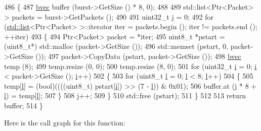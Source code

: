 \begin{DoxyCode}
486 \{
487   \hyperlink{namespacens3_a184f2682613716e1a24969b3e70b4242}{bvec} buffer (burst->GetSize () * 8, 0);
488 
489   std::list<Ptr<Packet> > packets = burst->GetPackets ();
490 
491   uint32\_t j = 0;
492   \textcolor{keywordflow}{for} (\hyperlink{openflow-interface_8h_afd9bcfa176617760671b67580f536fa7}{std::list}<Ptr<Packet> >::iterator iter = packets.begin (); iter != packets.end (); ++iter)
493     \{
494       Ptr<Packet> packet = *iter;
495       uint8\_t *pstart = (uint8\_t*) std::malloc (packet->GetSize ());
496       std::memset (pstart, 0, packet->GetSize ());
497       packet->CopyData (pstart, packet->GetSize ());
498       \hyperlink{namespacens3_a184f2682613716e1a24969b3e70b4242}{bvec} temp (8);
499       temp.resize (0, 0);
500       temp.resize (8, 0);
501       \textcolor{keywordflow}{for} (uint32\_t \hyperlink{bernuolliDistribution_8m_a6f6ccfcf58b31cb6412107d9d5281426}{i} = 0; \hyperlink{bernuolliDistribution_8m_a6f6ccfcf58b31cb6412107d9d5281426}{i} < packet->GetSize (); \hyperlink{bernuolliDistribution_8m_a6f6ccfcf58b31cb6412107d9d5281426}{i}++)
502         \{
503           \textcolor{keywordflow}{for} (uint8\_t \hyperlink{buildings__pathloss_8m_a5b54c0a045f179bcbbbc9abcb8b5cd4c}{l} = 0; \hyperlink{buildings__pathloss_8m_a5b54c0a045f179bcbbbc9abcb8b5cd4c}{l} < 8; \hyperlink{buildings__pathloss_8m_a5b54c0a045f179bcbbbc9abcb8b5cd4c}{l}++)
504             \{
505               temp[\hyperlink{buildings__pathloss_8m_a5b54c0a045f179bcbbbc9abcb8b5cd4c}{l}] = (bool)((((uint8\_t) pstart[\hyperlink{bernuolliDistribution_8m_a6f6ccfcf58b31cb6412107d9d5281426}{i}]) >> (7 - \hyperlink{buildings__pathloss_8m_a5b54c0a045f179bcbbbc9abcb8b5cd4c}{l})) & 0x01);
506               buffer.at (j * 8 + \hyperlink{buildings__pathloss_8m_a5b54c0a045f179bcbbbc9abcb8b5cd4c}{l}) = temp[\hyperlink{buildings__pathloss_8m_a5b54c0a045f179bcbbbc9abcb8b5cd4c}{l}];
507             \}
508           j++;
509         \}
510       std::free (pstart);
511     \}
512 
513   \textcolor{keywordflow}{return} buffer;
514 \}
\end{DoxyCode}


Here is the call graph for this function\+:


